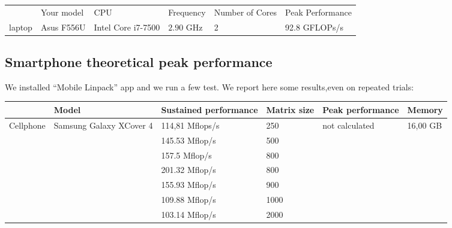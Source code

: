 \documentclass[11pt]{scrartcl} %
\begin{document}

\begin{table}[H]
		\begin{tabular}[H]{l| l| l| l| l| l }
			&Your model&CPU&Frequency&Number of Cores&Peak Performance\\
			laptop& Asus F556U & Intel Core i7-7500 &$2.90$ GHz&2&92.8 GFLOPs/s
		\end{tabular}
	\label{Result}
\end{table}

\subsection{Smartphone theoretical peak performance}
We installed "`Mobile Linpack"' app and we run a few test. We report here some results,even on repeated trials: 
\begin{adjustwidth}{-2cm}{}
	\begin{tabular}[H]{l| p{}| l |l| l|l }
		\hline
			&Model& Sustained performance&Matrix size&Peak performance&Memory\\
			\hline
			Cellphone&Samsung Galaxy XCover 4 &114,81 Mflops/s &250 &not calculated&16,00 GB\\
			& &145.53 Mflop/s&500& &\\
			& &157.5 Mflop/s&800& &\\
			& &201.32 Mflop/s&800& &\\
			& &155.93 Mflop/s&900& &\\
			& &109.88 Mflop/s&1000& &\\
			& &103.14 Mflop/s&2000& &\\
		\end{tabular}
\end{adjustwidth}
\end{document}
